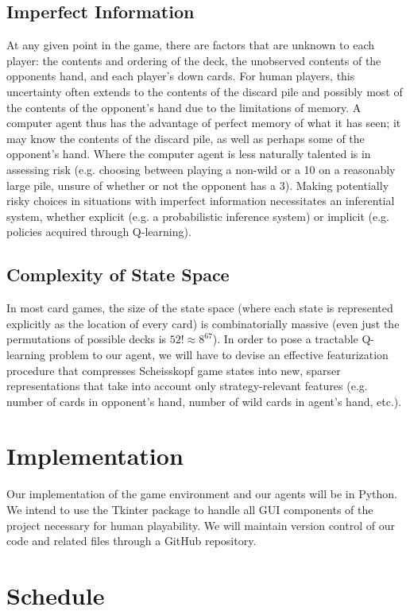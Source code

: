 \documentclass[paper=a4, fontsize=11pt]{scrartcl}
\numberwithin{equation}{section}		%
\numberwithin{figure}{section}			%
\numberwithin{table}{section}				%
\begin{document}
\subsection{Imperfect Information}
At any given point in the game, there are factors that are unknown to each player: the contents and ordering of the deck, the unobserved contents of the opponents hand, and each player's down cards. For human players, this uncertainty often extends to the contents of the discard pile and possibly most of the contents of the opponent's hand due to the limitations of memory. A computer agent thus has the advantage of perfect memory of what it has seen; it may know the contents of the discard pile, as well as perhaps some of the opponent's hand. Where the computer agent is less naturally talented is in assessing risk (e.g. choosing between playing a non-wild or a 10 on a reasonably large pile, unsure of whether or not the opponent has a 3). Making potentially risky choices in situations with imperfect information necessitates an inferential system, whether explicit (e.g. a probabilistic inference system) or implicit (e.g. policies acquired through Q-learning).

\subsection{Complexity of State Space}
In most card games, the size of the state space (where each state is represented explicitly as the location of every card) is combinatorially massive (even just the permutations of possible decks is $52! \approx 8^{67}$). In order to pose a tractable Q-learning problem to our agent, we will have to devise an effective featurization procedure that compresses Scheisskopf game states into new, sparser representations that take into account only strategy-relevant features (e.g. number of cards in opponent's hand, number of wild cards in agent's hand, etc.).

\section{Implementation}

Our implementation of the game environment and our agents will be in Python. We intend to use the Tkinter package to handle all GUI components of the project necessary for human playability. We will maintain version control of our code and related files through a GitHub repository.

\section{Schedule}
\end{document}
